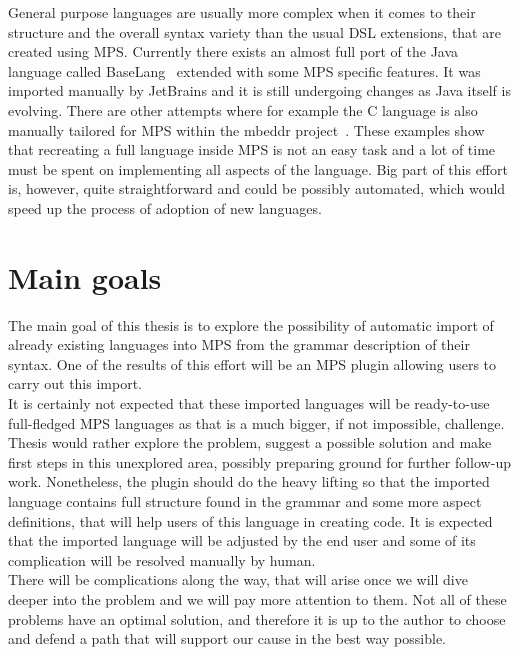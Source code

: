 General purpose languages are usually more complex when it comes to their structure and the overall syntax variety than the usual DSL extensions, that are created using MPS. Currently there exists an almost full port of the Java language called BaseLang~\cite{BaseLang} extended with some MPS specific features. It was imported manually by JetBrains and it is still undergoing changes as Java itself is evolving. There are other attempts where for example the C language is also manually tailored for MPS within the mbeddr project~\cite{mbeddr}. These examples show that recreating a full language inside MPS is not an easy task and a lot of time must be spent on implementing all aspects of the language. Big part of this effort is, however, quite straightforward and could be possibly automated, which would speed up the process of adoption of new languages.

\section{Main goals}

The main goal of this thesis is to explore the possibility of automatic import of already existing languages into MPS from the grammar description of their syntax. One of the results of this effort will be an MPS plugin allowing users to carry out this import.
\\

It is certainly not expected that these imported languages will be ready-to-use full-fledged MPS languages as that is a much bigger, if not impossible, challenge. Thesis would rather explore the problem, suggest a possible solution and make first steps in this unexplored area, possibly preparing ground for further follow-up work. Nonetheless, the plugin should do the heavy lifting so that the imported language contains full structure found in the grammar and some more aspect definitions, that will help users of this language in creating code. It is expected that the imported language will be adjusted by the end user and some of its complication will be resolved manually by human.
\\

There will be complications along the way, that will arise once we will dive deeper into the problem and we will pay more attention to them. Not all of these problems have an optimal solution, and therefore it is up to the author to choose and defend a path that will support our cause in the best way possible.
\\

